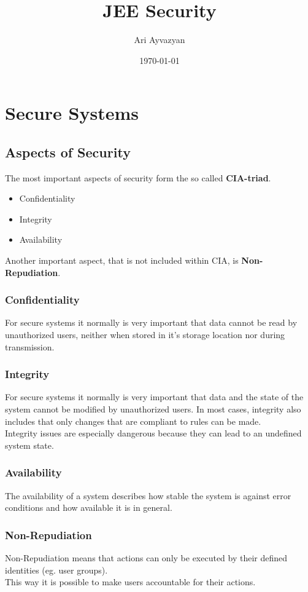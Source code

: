 \documentclass[12pt,a4paper]{report}
\date{\today}
\author{Ari Ayvazyan}
\title{JEE Security}
\begin{document}
\maketitle
\tableofcontents


\chapter{Secure Systems}
\section{Aspects of Security}
The most important aspects of security form the so called \textbf{CIA-triad}.

\begin{itemize}
\item Confidentiality
\item Integrity
\item Availability
\end{itemize}

Another important aspect, that is not included within CIA, is \textbf{Non-Repudiation}.

\subsection{Confidentiality}
For secure systems it normally is very important that data cannot be read by unauthorized users, neither when stored in it's storage location nor during transmission.

\subsection{Integrity}
For secure systems it normally is very important that data and the state of the system cannot be modified by unauthorized users. In most cases, integrity also includes that only changes that are compliant to rules can be made.\\
Integrity issues are especially dangerous because they can lead to an undefined system state.

\subsection{Availability}
The availability of a system describes how stable the system is against error conditions and how available it is in general.

\subsection{Non-Repudiation}
Non-Repudiation means that actions can only be executed by their defined identities (eg. user groups).\\
This way it is possible to make users accountable for their actions.
\end{document}
